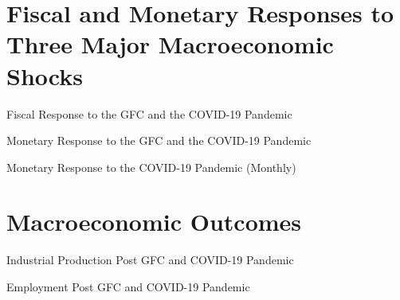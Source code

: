\documentclass{beamer}
\begin{document}
\section{Fiscal and Monetary Responses to Three Major Macroeconomic Shocks}

\begin{frame}{Fiscal Response to the GFC and the COVID-19 Pandemic}

\begin{figure}[h!]
     \centering
     
\end{figure} 
	
\end{frame}

\begin{frame}{Monetary Response to the GFC and the COVID-19 Pandemic}

\begin{figure}[h!]
     \centering
     
\end{figure} 
	
\end{frame}

\begin{frame}{Monetary Response to the COVID-19 Pandemic (Monthly)}

\begin{figure}[h!]
     \centering
     
\end{figure} 
	
\end{frame}


\section{Macroeconomic Outcomes}

\begin{frame}{Industrial Production Post GFC and COVID-19 Pandemic}

\begin{figure}[h!]
     \centering
     
\end{figure} 
	
\end{frame}

\begin{frame}{Employment Post GFC and COVID-19 Pandemic}

\begin{figure}[h!]
     \centering
     
\end{figure} 
	
\end{frame}
\end{document}
